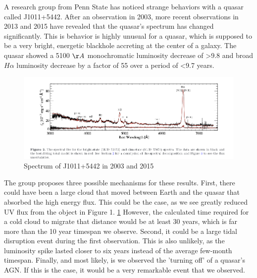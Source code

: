 \documentclass{article}
\begin{document}
A research group from Penn State has noticed strange behaviors with a quasar called 
J1011+5442.\cite{runnoe} After an observation in 2003, more recent observations in 
2013 and 2015 have revealed that the quasar's spectrum has changed significantly. 
This is behavior is highly unusual for a quasar, which is supposed to be a very 
bright, energetic blackhole accreting at the center of a galaxy. The quasar showed 
a 5100 $\AA$ monochromatic luminosity decrease of \textgreater 9.8 and broad 
$H\alpha$ luminosity decrease by a factor of 55 over a period of \textless 9.7 
years. 

\begin{figure}[h]
  \label{fig:plot}
  \caption{Spectrum of J1011+5442 in 2003 and 2015}
  \centering
  \includegraphics[scale=0.5]{fig2.png}
\end{figure}

The group proposes three possible mechanisms for these results. First, there 
could have been a large cloud that moved between Earth and the quasar that absorbed 
the high energy flux. This could be the case, as we see greatly reduced UV flux from 
the object in Figure 1. \ref{fig:plot} However, the calculated time required for a 
cold cloud to migrate that distance would be at least 30 years, which is far more 
than the 10 year timespan we observe. Second, it could be a large tidal disruption 
event during the first observation. This is also unlikely, as the luminosity spike 
lasted closer to six years instead of the average few-month timespan. Finally, and 
most likely, is we observed the 'turning off' of a quasar's AGN. If this is the 
case, it would be a very remarkable event that we observed. 



\end{document}
